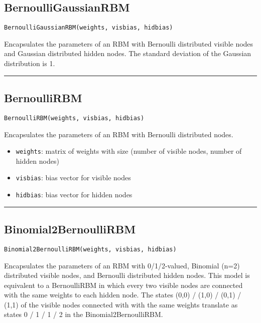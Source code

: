 \subsection*{BernoulliGaussianRBM}  \label{bms_BernoulliGaussianRBM}
\begin{verbatim}
BernoulliGaussianRBM(weights, visbias, hidbias)
\end{verbatim}
Encapsulates the parameters of an RBM with Bernoulli distributed visible nodes and Gaussian distributed hidden nodes. The standard deviation of the Gaussian distribution is 1.

\noindent\rule{\textwidth}{1pt}
\subsection*{BernoulliRBM}  \label{bms_BernoulliRBM}
\begin{verbatim}
BernoulliRBM(weights, visbias, hidbias)
\end{verbatim}
Encapsulates the parameters of an RBM with Bernoulli distributed nodes.

\begin{itemize}
\item \texttt{weights}: matrix of weights with size (number of visible nodes, number of hidden nodes)


\item \texttt{visbias}: bias vector for visible nodes


\item \texttt{hidbias}: bias vector for hidden nodes

\end{itemize}
\noindent\rule{\textwidth}{1pt}
\subsection*{Binomial2BernoulliRBM}  \label{bms_Binomial2BernoulliRBM}
\begin{verbatim}
Binomial2BernoulliRBM(weights, visbias, hidbias)
\end{verbatim}
Encapsulates the parameters of an RBM with 0/1/2-valued, Binomial (n=2) distributed visible nodes, and Bernoulli distributed hidden nodes. This model is equivalent to a BernoulliRBM in which every two visible nodes are connected with the same weights to each hidden node. The states (0,0) / (1,0) / (0,1) / (1,1) of the visible nodes connected with with the same weights translate as states 0 / 1 / 1 / 2 in the Binomial2BernoulliRBM.

